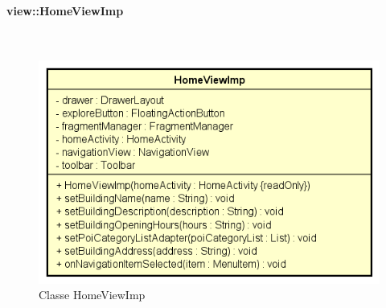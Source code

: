 \documentclass[../DefinizioneDiProdotto.tex]{subfiles}
\begin{document}
\paragraph{view::HomeViewImp}
\
\begin{figure}[H]
	\centering
	\includegraphics[width=\maxwidth]{img/HomeViewImp.png}
	\caption{Classe HomeViewImp}\label{fig:view::HomeViewImp} 
\end{figure}
\end{document}
